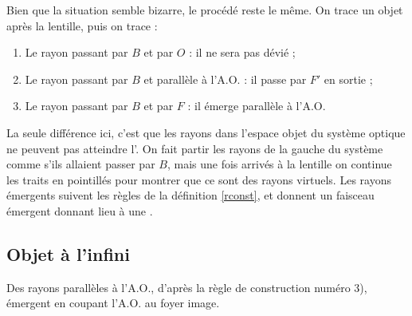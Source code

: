 \documentclass[10pt,a5paper,notitlepage]{book}
\begin{document}
Bien que la situation semble bizarre, le procédé reste le même. On
trace un objet après la lentille, puis on trace :
\begin{enumerate}
    \item Le rayon passant par $B$ et par $O$ : il ne sera pas dévié ;
    \item Le rayon passant par $B$ et parallèle à l'A.O. : il passe par $F'$ en
        sortie ;
    \item Le rayon passant par $B$ et par $F$ : il émerge parallèle à l'A.O.
\end{enumerate}

La seule différence ici, c'est que les rayons dans l'espace objet du
système optique ne peuvent pas atteindre l'. On fait partir les rayons de
la gauche du système comme s'ils allaient passer par $B$, mais une fois arrivés
à la lentille on continue les traits en pointillés pour montrer que ce sont des
rayons virtuels. Les rayons émergents suivent les règles de la définition
\ref{rconst}, et donnent un faisceau émergent  donnant lieu à une
.

\subsection{Objet à l'infini}
Des rayons parallèles à l'A.O., d'après la règle de construction
numéro \textcolor{brandeisblue}{3)}, émergent en coupant l'A.O. au foyer image.
\end{document}
